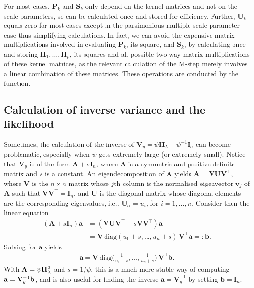 For most cases, $\mathbf P_k$ and $\mathbf S_k$ only depend on the kernel matrices and not on the scale parameters, so can be calculated once and stored for efficiency. Further, $\mathbf U_k$ equals zero for most cases except in the parsimonious multiple scale parameter case thus simplifying calculations. In fact, we can avoid the expensive matrix multiplications involved in evaluating $\mathbf P_k$, its square, and $\mathbf S_k$, by calculating once and storing $\mathbf H_1, \dots, \mathbf H_p$, its squares and all possible two-way matrix multiplications of these kernel matrices, as the relevant calculation of the M-step merely involves a linear combination of these matrices. These operations are conducted by the  function.

\subsection{Calculation of inverse variance and the likelihood}

Sometimes, the calculation of the inverse of $\mathbf V_y = \psi\mathbf H_\lambda + \psi^{-1}\mathbf I_n$ can become problematic, especially when $\psi$ gets extremely large (or extremely small). Notice that $\mathbf V_y$ is of the form $\mathbf A + s\mathbf I_n$, where $\mathbf A$ is a symmetric and positive-definite matrix and $s$ is a constant. An eigendecomposition of $\mathbf A$ yields $\mathbf A = \mathbf V \mathbf U \mathbf V^\top$, where $\mathbf V$ is the $n \times n$ matrix whose $j$th column is the normalised eigenvector $\mathbf v_j$ of $\mathbf A$ such that $\mathbf V\mathbf V^\top = \mathbf I_n$, and $\mathbf U$ is the diagonal matrix whose diagonal elements are the corresponding eigenvalues, i.e., $\mathbf U_{ii} = u_i$, for $i=1,\dots,n$. Consider then the linear equation
\begin{align*}
	(\mathbf A + s\mathbf I_n)\mathbf a &= (\mathbf V \mathbf U \mathbf V^\top + s  \mathbf V \mathbf V^\top)\mathbf a \\
	&= \mathbf V \, \text{diag}(u_1 \!+\! s, \dots, u_n \!+\! s) \, \mathbf V^\top \mathbf a =: \mathbf b.
\end{align*}
Solving for $\mathbf a$ yields
\begin{align}\label{eq:linsolve}
	\mathbf a = \mathbf V \, \text{diag} \Bigg( \frac{1}{u_1 \!+\! s}, \dots, \frac{1}{u_n \!+\! s} \Bigg) \, \mathbf V^\top \mathbf b.
\end{align}
With $\mathbf A = \psi\mathbf H_\lambda^2$ and $s=1/\psi$, this is a much more stable way of computing $\mathbf a = \mathbf{V}_y^{-1} \mathbf b$, and is also useful for finding the inverse $\mathbf a = \mathbf V_y^{-1}$ by setting $\mathbf b=\mathbf I_n$. %

